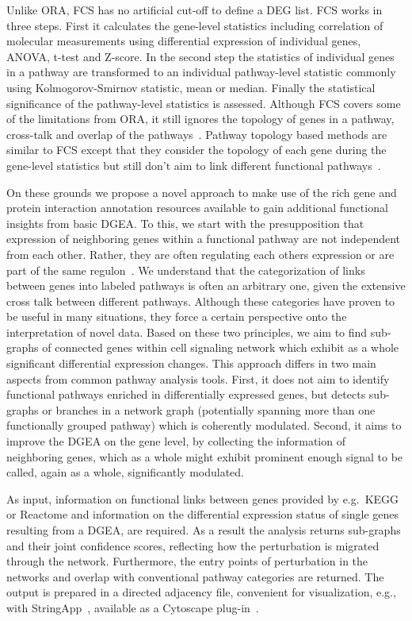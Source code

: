 \documentclass[10pt,a4paper,twocolumn]{article}
\begin{document}
Unlike ORA, FCS has no artificial cut-off to define a DEG list. FCS works in
three steps. First it calculates the gene-level statistics including
correlation of molecular measurements using differential expression of
individual genes, ANOVA, t-test and Z-score. In the second step the
statistics of individual genes in a pathway are transformed to an
individual pathway-level statistic commonly using Kolmogorov-Smirnov
statistic, mean or median. Finally the statistical significance of the
pathway-level statistics is assessed. Although FCS covers some of the
limitations from ORA, it still ignores the topology of genes in a pathway,
cross-talk and overlap of the pathways~\cite{Khatri2012,Campos}. Pathway
topology based methods are similar to FCS except that they consider the
topology of each gene during the gene-level statistics but still don't aim
to link different functional pathways~\cite{Khatri2012}.

On these grounds we propose a novel approach to make use of the rich gene
and protein interaction annotation resources available to gain additional
functional insights from basic DGEA. To this, we start with the
presupposition that expression of neighboring genes within a functional
pathway are not independent from each other. Rather, they are often
regulating each others expression or are part of the same
regulon~\cite{Michalak}. We understand that the categorization of links
between genes into labeled pathways is often an arbitrary one, given the
extensive cross talk between different pathways. Although these categories
have proven to be useful in many situations, they force a certain
perspective onto the interpretation of novel data. Based on these two
principles, we aim to find sub-graphs of connected genes within cell
signaling network which exhibit as a whole significant differential
expression changes. This approach differs in two main aspects from common
pathway analysis tools. First, it does not aim to identify functional
pathways enriched in differentially expressed genes, but detects sub-graphs
or branches in a network graph (potentially spanning more than one
functionally grouped pathway) which is coherently modulated. Second, it
aims to improve the DGEA on the gene level, by collecting the information
of neighboring genes, which as a whole might exhibit prominent enough
signal to be called, again as a whole, significantly modulated.

As input, information on functional links between genes provided by
e.g.~KEGG or Reactome and information on the differential expression status
of single genes resulting from a DGEA, are required. As a result the
analysis returns sub-graphs and their joint confidence scores, reflecting
how the perturbation is migrated through the network. Furthermore, the
entry points of perturbation in the networks and overlap with conventional
pathway categories are returned. The output is prepared in a directed
adjacency file, convenient for visualization, e.g., with
StringApp~\cite{StringApp}, available as a Cytoscape plug-in~\cite{Cyto}.
\end{document}
